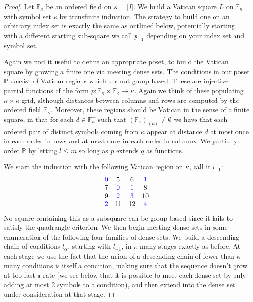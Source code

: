 \documentclass[12pt,a4paper]{article}
\newcommand{\F}{\mathbb{F}}
\newcommand{\To}{\longrightarrow}
\renewcommand{\P}{\mathbb{P}}
\begin{document}
\begin{proof}
Let $\F_\kappa$ be an ordered field on $\kappa=|I|$.
We build a Vatican square $L$ on $\F_\kappa$ with symbol set $\kappa$ by transfinite induction. The strategy to build one on an arbitrary index set is exactly the same as outlined below, potentially starting with a different starting sub-square we call $p_{-1}$ depending on your index set and symbol set.

Again we find it useful to define an appropriate poset, to build the Vatican square by growing a finite one via meeting dense sets. The conditions in our poset $\P$ consist of Vatican regions which are not group based. These are injective partial functions of the form $p:\F_\kappa \times \F_\kappa\To\kappa$. Again we think of these populating $\kappa\times\kappa$ grid, although distances between columns and rows are computed by the ordered field $\F_\kappa$. Moreover, these regions should be Vatican in the sense of a finite square, in that for each $d\in \F_\kappa^+$ such that ${(\F_\kappa)}_{(d)}\neq\emptyset$ we have that each ordered pair of distinct symbols coming from $\kappa$ appear at distance $d$ at most once in each order in rows and at most once in each order in columns. We partially order $\P$ by letting $l \leq m$ so long as $p$ extends $q$ as functions.

We start the induction with the following Vatican region on $\kappa$, call it $l_{-1}$:
$$\begin{array}{cccc}
	\color{blue} 0 & 5 & 6 & \color{blue} 1 \\ 
	7 & \color{blue} 0 & \color{blue}1 & 8  \\
	9 & \color{blue}2 & \color{blue} 3 & 10 \\
	\color{blue} 2 & 11 & 12 & \color{blue} 4 
\end{array}$$
No square containing this as a subsquare can be group-based since it fails to satisfy the quadrangle criterion.
We then begin meeting dense sets in some enumeration of the following four families of dense sets.
We build a descending chain of conditions $l_\alpha$, starting with $l_{-1}$, in $\kappa$ many stages exactly as before. At each stage we use the fact that the union of a descending chain of fewer than $\kappa$ many conditions is itself a condition, making sure that the sequence doesn't grow at too fast a rate (we see below that it is possible to meet each dense set by only adding at most 2 symbols to a condition), and then extend into the dense set under consideration at that stage.


\end{proof}
\end{document}
